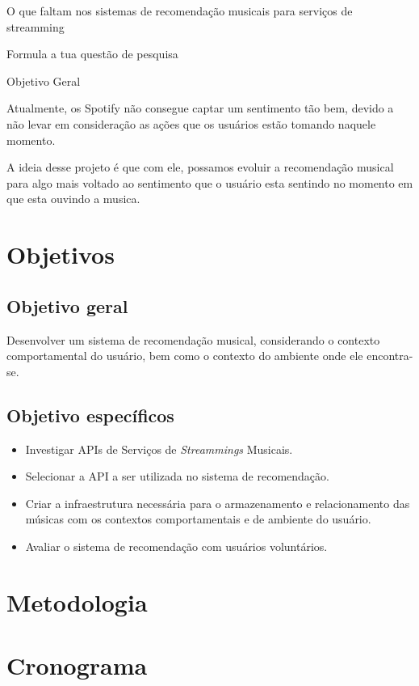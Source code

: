 \documentclass{article}
\begin{document}




O que faltam nos sistemas de recomendação musicais para serviços de streamming


Formula a tua questão de pesquisa


Objetivo Geral


Atualmente, os Spotify não consegue captar um sentimento tão bem, devido a não levar em consideração as ações que os usuários estão tomando naquele momento. 

A ideia desse projeto é que com ele, possamos evoluir a recomendação musical para algo mais voltado ao sentimento que o usuário esta sentindo no momento em que esta ouvindo a musica.

\newpage

\section{Objetivos}

\subsection{Objetivo geral}

Desenvolver um sistema de recomendação musical, considerando o contexto comportamental do usuário, bem como o contexto do ambiente onde ele encontra-se.

\subsection{Objetivo específicos}

\begin{itemize}
\item Investigar APIs de Serviços de \textit{Streammings} Musicais.

\item Selecionar a API a ser utilizada no sistema de recomendação.

\item Criar a infraestrutura necessária para o armazenamento e relacionamento das músicas com os contextos comportamentais e de ambiente do usuário.

\item Avaliar o sistema de recomendação com usuários voluntários.

\end{itemize}

\newpage

\section{Metodologia}

\newpage

\section{Cronograma}

\newpage


% 

\end{document}
